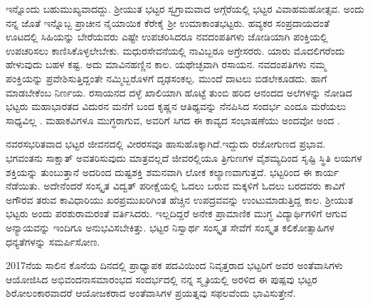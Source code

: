 {ಇನ್ನೊಂದು ಬಹುಮುಖ್ಯವಾದದ್ದು. ಶ್ರೀಯುತ ಭಟ್ಟರ ಸ್ವಗ್ರಾಮವಾದ ಅಗ್ಗೆರೆ\-ಯಲ್ಲಿ ಭಟ್ಟರ ವಿವಾಹಮಹೋತ್ಸವ. ಅಂದು ನನ್ನ ಜೊತೆ ಇನ್ನೊಬ್ಬ ಪ್ರಾಚೀನ ನೈಯಾಯಿಕ ಕೆರೇಕೈ ಶ್ರೀ ಉಮಾಕಾಂತಭಟ್ಟರು. ಹವ್ಯಕರ ಸಂಪ್ರದಾಯದಂತೆ ಊಟದಲ್ಲಿ ಸಿಹಿಯನ್ನು ಬೇರೆಯವರು ಎಷ್ಟೇ ಉಪಚರಿಸಿದರೂ ನವದಂಪತಿಗಳು ಜೋಡಿಯಾಗಿ ಪಂಕ್ತಿಯಲ್ಲಿ ಉಪಚರಿಸಲು ಕಾಣಿಸಿಕೊಳ್ಳಲೇಬೇಕು. ಮಧುರಸೇವನೆಯಲ್ಲಿ ನಾವಿಬ್ಬರೂ ಅಗ್ರೇಸರರು. ಯಾರು ಮೊದಲಿಗರೆಂದು ಹೇಳುವುದು ಬಹಳ ಕಷ್ಟ. ಅದು ಮಾವಿನ\-ಹಣ್ಣಿನ ಕಾಲ. ಯಥೇಚ್ಛವಾಗಿ ರಸಾಯನ. ನವದಂಪತಿಗಳು ನಮ್ಮ ಪಂಕ್ತಿಯನ್ನು ಪ್ರವೇಶಿ\-ಸುತ್ತಿದ್ದಂತೇ ನಮ್ಮಿಬ್ಬರೊಳಗೆ ದೃಢಸಂಕಲ್ಪ. ಮುಂದೆ ದಾಟಲು ಬಿಡಲೇ\-ಕೂಡದು. ಹಾಗೆ ಮಾಡಬೇಕೆಂಬ ನಿರ್ಣಯ. ರಸಾಯನದ ದಳ್ಳೆ ಖಾಲಿಯಾಗಿ ಹೊಟ್ಟೆ ತುಂಬಿ ಹರಿದ ಆನಂದದ ಅಲೆಗಳನ್ನು ನೋಡಿದ ಭಟ್ಟರು ಮಹಾಭಾರತದ ವಿದುರನ ಮನೆಗೆ ಬಂದ ಕೃಷ್ಣನ ಆತಿಥ್ಯವನ್ನು ನೆನಪಿಸಿದ ಸಂದರ್ಭ ಎಂದೂ ಮರೆಯಲು ಸಾಧ್ಯವಿಲ್ಲ . ಮಹಾಕವಿಗಳೂ ಮುಗ್ಧರಾಗುವ, ಅವರಿಗೆ ಸಿಗದ ಈ ಕಾವ್ಯದ ಸಂಭಾಷಣೆಯು ಅಂದವೋ ಅಂದ .

ನವರಸಭರಿತವಾದ ಭಟ್ಟರ ಜೀವನದಲ್ಲಿ ವೀರರಸವೂ ಹಾಸುಹೊಕ್ಕಾಗಿದೆ.ಇದ್ದುದು ರಜೋಗುಣದ ಪ್ರಭಾವ. ಭಗವಂತನು ಸಾಕ್ಷಾತ್ ಅವತರಿಸುವುದು ಮಾತ್ರವಲ್ಲದೆ ಜೀವರಲ್ಲಿಯೂ ತ್ರಿಗುಣಗಳ ವೈಶಮ್ಯದಿಂದ ಸೃಷ್ಟಿ  \enginline{-}  ಸ್ಥಿತಿ  \enginline{-}  ಲಯಗಳ ಶಕ್ತಿಯನ್ನು ತುಂಬುತ್ತಾನೆ ಅದರಿಂದ ದುಷ್ಟಶಕ್ತಿ ಶಮನವಾಗಿ ಲೋಕ ಕಲ್ಯಾಣವಾಗುತ್ತದೆ. ಭಟ್ಟರಿಂದ ಈ ಕಾರ್ಯ ನೆಡೆಯಿತು. ಅದೇನೆಂದರೆ ಸಂಸ್ಕೃತ ವಿದ್ವತ್ ಪರೀಕ್ಷೆಯಲ್ಲಿ ಓದಲು ಬರುವ ಮಕ್ಕಳಿಗೆ ಓದಲು ಬರದವರು ಕಾವಿಗೆ ಅಗೌರವ ತರುವ ಕಾವಿಧಾರಿಯು ಖರಪ್ರಮುಖರಿಗಿಂತ ಹೆಚ್ಚಿನ ಉಪದ್ರವವನ್ನು ಉಂಟುಮಾಡುತ್ತಿದ್ದ ಕಾಲ. ಶ್ರೀಯುತ ಭಟ್ಟರು ಅಂದು ಪರಶು\-ರಾಮರಂತೆ ವರ್ತಿಸಿದರು. ಇಲ್ಲದಿದ್ದರೆ ಅನೇಕ ಪ್ರಾಮಾಣಿಕ ಮುಗ್ಧ ವಿದ್ಯಾರ್ಥಿ\-ಗಳಿಗೆ ಆಗುವ ಅನ್ಯಾಯವನ್ನು ಇಂದಿಗೂ ಅನುಭವಿಸಬೇಕಿತ್ತು. ಭಟ್ಟರ ನಿಸ್ವಾರ್ಥ ಸಂಸ್ಕೃತ ಸೇವೆಗೆ ಸಂಸ್ಕೃತ ಕಲಿಕೋತ್ಸಾಹಿಗಳ ಧನ್ಯತೆಗಳನ್ನು ಸಮರ್ಪಿಸೋಣ.


2017ನೆಯ ಸಾಲಿನ ಕೊನೆಯ ದಿನದಲ್ಲಿ ಪ್ರಾಧ್ಯಾಪಕ ಪದವಿಯಿಂದ ನಿವೃತ್ತರಾದ ಭಟ್ಟರಿಗೆ ಅವರ ಅಂತೆವಾಸಿಗಳು ಆಯೋಜಿಸಿದ ಅಭಿವಂದನಾಸಮಾರಂಭದ ಸಂದರ್ಭದಲ್ಲಿ ನನ್ನ ಸ್ಮೃತಿಯಲ್ಲಿ ಅರಳಿದ ಈ ಪುಷ್ಪವು ಭಟ್ಟರ ಶಿರೋಲಂಕಾರವಾದರೆ  ಆಯೋಜಕ\-ರಾದ ಅಂತೆವಾಸಿಗಳ ಪ್ರಯತ್ನವು ಸಫಲವೆಂದು ಭಾವಿಸುತ್ತೇನೆ.
\vskip -10pt

\articleend
}
